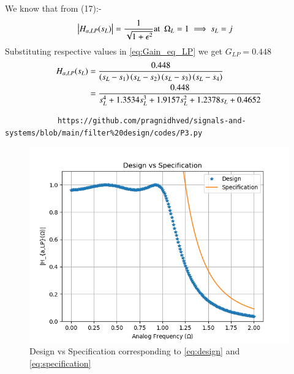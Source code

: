 \documentclass{article}
\begin{document}
\begin{enumerate}
		We know that from (17):-
		\begin{align}
			\left\vert H_{a,LP}(s_L)\right\vert &= \frac{1}{\sqrt{1+\epsilon^2}} \text{at} \hspace{5pt} \Omega_{L}=1 \implies s_{L} = j \label{eq:Gain_eq_LP} 
		\end{align}
		Substituting respective values in \eqref{eq:Gain_eq_LP} we get $G_{LP}=0.448$
		\begin{align}
			H_{a,LP}(s_L) &= \frac{0.448}{\left(s_L-s_1\right)\left(s_L-s_2\right)\left(s_L-s_3\right)\left(s_L-s_4\right)}\\
			&= \frac{0.448}{s_{L}^4 + 1.3534s_L^3 + 1.9157s_L^2 + 1.2378s_L + 0.4652}\label{eq:design}
		\end{align}
		\begin{lstlisting}
			https://github.com/pragnidhved/signals-and-systems/blob/main/filter%20design/codes/P3.py
		\end{lstlisting}
		\begin{figure}[htbp]
			\centering
			\includegraphics[width=1\linewidth]{figs/fig3}
			\caption{Design vs Specification corresponding to \eqref{eq:design} and \eqref{eq:specification}}
			\label{fig:design_vs_specf}
		\end{figure}
		

\end{enumerate}
\end{document}
